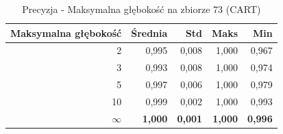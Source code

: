 \begin{table}[htbp]
\centering
\small
\setlength{\tabcolsep}{6pt}
\renewcommand{\arraystretch}{1.2}
\caption{Precyzja - Maksymalna głębokość na zbiorze 73 (CART)}
\label{tab:CART_max_depth_73_precision}
\begin{tabular}{r|r|r|r|r}
\toprule
Maksymalna głębokość & Średnia & Std & Maks & Min \\
\hline
2 & 0,995 & 0,008 & 1,000 & 0,967 \\
3 & 0,993 & 0,008 & 1,000 & 0,974 \\
5 & 0,997 & 0,006 & 1,000 & 0,979 \\
10 & 0,999 & 0,002 & 1,000 & 0,993 \\
\textbf{$\infty$} & \textbf{1,000} & \textbf{0,001} & \textbf{1,000} & \textbf{0,996} \\
\bottomrule
\end{tabular}
\end{table}